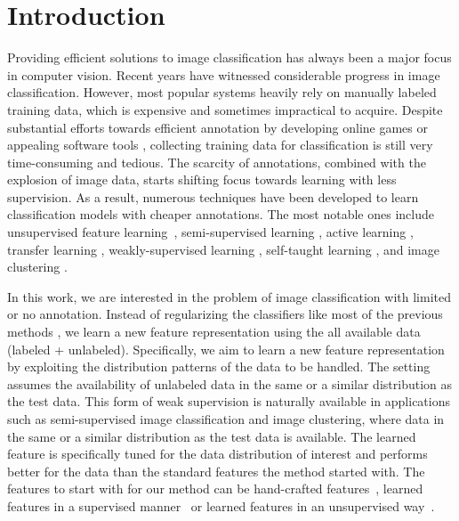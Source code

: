 \section{Introduction}
\label{en:sec:intro}
Providing efficient solutions to image classification has always been a
major focus in computer vision. Recent years have witnessed
considerable progress in image classification. However, most popular
systems \citep{lazebnik:cvpr06, Indoor, siftllc:cvpr10, 
Sun_2010, dai:TSC:11, Yang_2014_CVPR, nips12:cnn} heavily rely
on manually labeled training data, which is expensive and sometimes
impractical to acquire. Despite substantial efforts towards
efficient annotation by developing online games \citep{game:purpose}
or appealing software tools \citep{labelme}, collecting training data
for classification is still very time-consuming and tedious. The scarcity
of annotations, combined with the explosion of image data, starts
shifting focus towards learning with less supervision. As a result,
numerous techniques have been developed to learn classification models
with cheaper annotations. The most notable ones include unsupervised feature 
learning~\citep{stl-10, cnnfet14, feature:context, feature:LSTM},  
semi-supervised learning \citep{Fergus09, Guillaumin:cvpr:10, dai:iccv13b}, 
active learning \citep{JainK:cvpr09, cvpr09:multi:al},
transfer learning \citep{Transfer:CVPR:08, tl:survey},
weakly-supervised learning \citep{cvpr12:weak:video, metric:imitation}, self-taught learning
\citep{self-taught:icml07}, and image clustering
\citep{Sivic05b, dai}.


In this work, we are interested in the problem of  image classification 
with limited or no annotation. Instead of regularizing the
classifiers like most of the previous methods \citep{SemiSVM, Joachims:1999,
  SemiBoost, SemiForest}, we learn a new feature representation 
using the all available data (labeled + unlabeled). 
Specifically, we aim to learn a new feature representation by exploiting 
the distribution patterns of the data to be handled. The setting assumes the availability of 
unlabeled data in the same or a similar distribution as the test data. 
This form of weak supervision is naturally available in applications such as
semi-supervised  image classification and image clustering, where data in the same or a similar 
distribution as the test data is available. The learned feature is specifically tuned for the data distribution of interest 
and performs better for the data than the standard features the method started with.  
The features to start with for our method can be hand-crafted features~\citep{gist, Ojala02,Bosch:iccv07,siftllc:cvpr10},  
learned features in a supervised manner~\citep{caffe14, rich:feature:cvpr14, deep:bmvc14} or 
learned features in an unsupervised way~\citep{stl-10, cnnfet14, feature:context, feature:LSTM, feature:video}.  

